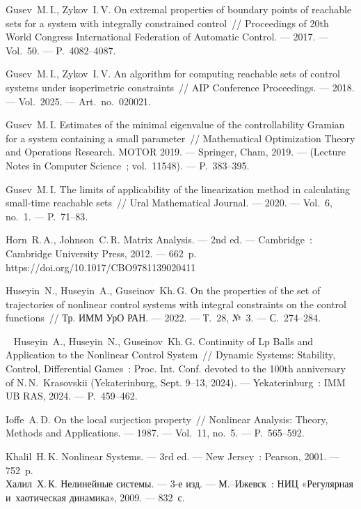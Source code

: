 \documentclass[../main.tex]{subfiles}
\begin{document}
\begin{thebibliography}{99}
Gusev~M.\,I., Zykov~I.\,V. On extremal properties of boundary points of reachable sets for a system with integrally constrained control~// Proceedings of 20th World Congress International Federation of Automatic Control. --- 2017. --- Vol.~50. --- P.~4082--4087.  

Gusev~M.\,I., Zykov~I.\,V. An algorithm for computing reachable sets of control systems under isoperimetric constraints~// AIP Conference Proceedings. --- 2018. --- Vol.~2025. --- Art.~no.~020021.

Gusev~M.\,I. Estimates of the minimal eigenvalue of the controllability Gramian for a system containing a small parameter~// Mathematical Optimization Theory and Operations Research. MOTOR 2019. --- Springer, Cham, 2019. --- (Lecture Notes in Computer Science~; vol.~11548). --- P.~383--395. 

Gusev~M.\,I. The limits of applicability of the linearization method in calculating small-time reachable sets~// Ural Mathematical Journal. --- 2020. --- Vol.~6, no.~1. --- P.~71--83.

Horn~R.\,A., Johnson~C.\,R. Matrix Analysis. --- 2nd ed. --- Cambridge~: Cambridge University Press, 2012. --- 662~p. https://doi.org/10.1017/CBO9781139020411

Huseyin~N., Huseyin~A., Guseinov~Kh.\,G. On the properties of the set of trajectories of nonlinear control systems with integral constraints on the control functions~// Тр. ИММ УрО РАН. --- 2022. --- Т.~28, №~3. --- С.~274--284.

 
Huseyin~A., Huseyin~N., Guseinov~Kh.\,G. Continuity of Lp Balls and Application to the Nonlinear Control System~// Dynamic Systems: Stability, Control, Differential Games~: Proc. Int. Conf. devoted to the 100th anniversary of N.\,N.~Krasovskii (Yekaterinburg, Sept. 9--13, 2024). --- Yekaterinburg~: IMM UB RAS, 2024. --- P.~459--462.

Ioffe~A.\,D. On the local surjection property~// Nonlinear Analysis: Theory, Methods and Applications. --- 1987. --- Vol.~11, no.~5. --- P.~565--592.


Khalil~H.\,K. Nonlinear Systems. --- 3rd ed. --- New Jersey~: Pearson, 2001. --- 752~p.
\\
Халил~Х.\,К. Нелинейные системы. --- 3-е изд. --- М.--Ижевск~: НИЦ «Регулярная и~хаотическая динамика», 2009. --- 832~с.



\end{thebibliography}
\end{document}
